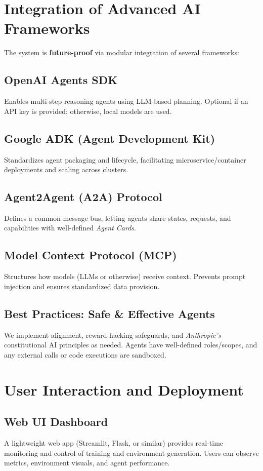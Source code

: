 \documentclass{article}
\begin{document}
\section{Integration of Advanced AI Frameworks}
The system is \textbf{future-proof} via modular integration of several frameworks:

\subsection{OpenAI Agents SDK}
Enables multi-step reasoning agents using LLM-based planning. Optional if an API key is provided; otherwise, local models are used.

\subsection{Google ADK (Agent Development Kit)}
Standardizes agent packaging and lifecycle, facilitating microservice/container deployments and scaling across clusters.

\subsection{Agent2Agent (A2A) Protocol}
Defines a common message bus, letting agents share states, requests, and capabilities with well-defined \emph{Agent Cards}.

\subsection{Model Context Protocol (MCP)}
Structures how models (LLMs or otherwise) receive context. Prevents prompt injection and ensures standardized data provision.

\subsection{Best Practices: Safe \& Effective Agents}
We implement alignment, reward-hacking safeguards, and \emph{Anthropic’s} constitutional AI principles as needed. Agents have well-defined roles/scopes, and any external calls or code executions are sandboxed.

\section{User Interaction and Deployment}

\subsection{Web UI Dashboard}
A lightweight web app (Streamlit, Flask, or similar) provides real-time monitoring and control of training and environment generation. Users can observe metrics, environment visuals, and agent performance.
\end{document}

